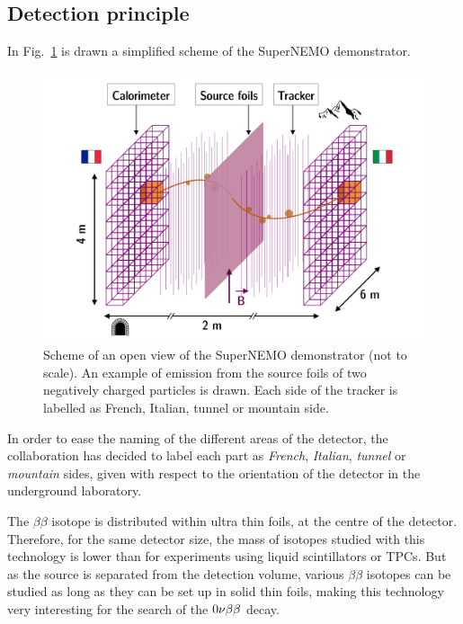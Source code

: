 \subsection{Detection principle}

In Fig.~\ref{fig:demonstrator_scheme} is drawn a simplified scheme of the SuperNEMO demonstrator.
\begin{figure}[h!]
\centering
\includegraphics[width=1\textwidth]{SNdemonstrator/fig_SNdemonstrator/demonstrator_sheme.pdf}
\caption{Scheme of an open view of the SuperNEMO demonstrator (not to scale).
  An example of emission from the source foils of two negatively charged particles is drawn.
  Each side of the tracker is labelled as French, Italian, tunnel or mountain side.
\label{fig:demonstrator_scheme}}
\end{figure}
In order to ease the naming of the different areas of the detector, the collaboration has decided to label each part as \emph{French}, \emph{Italian}, \emph{tunnel} or \emph{mountain} sides, given with respect to the orientation of the detector in the underground laboratory.

The $\beta\beta$ isotope is distributed within ultra thin foils, at the centre of the detector.
Therefore, for the same detector size, the mass of isotopes studied with this technology is lower than for experiments using liquid scintillators or TPCs.
But as the source is separated from the detection volume, various $\beta\beta$ isotopes can be studied as long as they can be set up in solid thin foils, making this technology very interesting for the search of the $0\nu\beta\beta$ decay.

